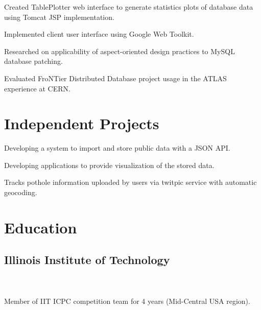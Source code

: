 \documentclass{resume}
\begin{document}
\begin{compactitem}
  \item Created TablePlotter web interface to generate statistics plots of database data using Tomcat JSP implementation.
  \item Implemented client user interface using Google Web Toolkit.
\end{compactitem}

\begin{compactitem}
  \item Researched on applicability of aspect-oriented design practices to MySQL database patching.
  \item Evaluated FroNTier Distributed Database project usage in the ATLAS experience at CERN.
\end{compactitem}

\section{Independent Projects}
\begin{compactitem}
  \item Developing a system to import and store public data with a JSON API.
  \item Developing applications to provide visualization of the stored data.
\end{compactitem}

\begin{compactitem}
  \item Tracks pothole information uploaded by users via twitpic service with automatic geocoding.
\end{compactitem}

\section{Education}

\subsection{Illinois Institute of Technology}

\\\\
Member of IIT ICPC competition team for 4 years (Mid-Central USA region).
\end{document}
